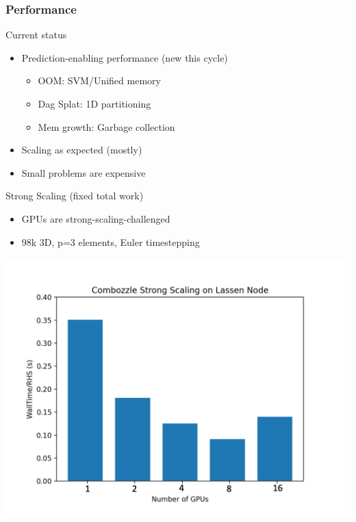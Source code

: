 \documentclass{beamer}
\begin{document}
\begin{frame}\frametitle{Performance}
\begin{center}
Current status
\end{center}
\begin{multicols}{2}
\begin{itemize}
\item Prediction-enabling performance (new this cycle)
\begin{itemize}
\item OOM: SVM/Unified memory
\item Dag Splat: 1D partitioning
\item Mem growth: Garbage collection
\end{itemize}
\item Scaling as expected (mostly)
\item Small problems are expensive
\end{itemize}
\end{multicols}
\begin{center}
Strong Scaling (fixed total work)\\
\end{center}
\begin{multicols}{2}
\begin{itemize}
\item GPUs are strong-scaling-challenged
\item 98k 3D, p=3 elements, Euler timestepping 
\end{itemize}
\columnbreak
\includegraphics[width=.48\textwidth]{figures/comboz_strong2.png}
\end{multicols}
\end{frame}
\end{document}

